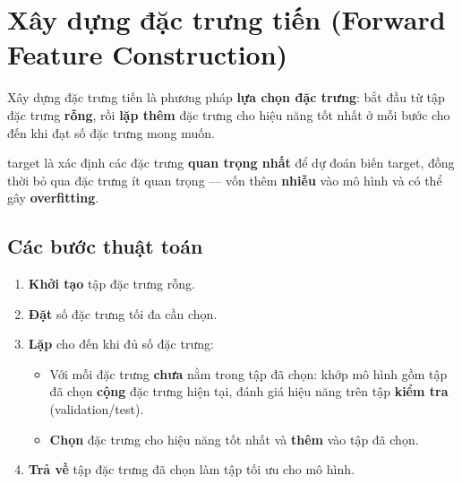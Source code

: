 \section{Xây dựng đặc trưng tiến (Forward Feature Construction)}
\label{sec:forward-feature-construction}

\begin{dinhnghia}[title={Forward Feature Construction}]
Xây dựng đặc trưng tiến là phương pháp \textbf{lựa chọn đặc trưng}: bắt đầu từ tập đặc trưng \textbf{rỗng}, rồi \textbf{lặp thêm} đặc trưng cho hiệu năng tốt nhất ở mỗi bước cho đến khi đạt số đặc trưng mong muốn.
\end{dinhnghia}

\begin{ynghia}[title={target lựa chọn đặc trưng}]
target là xác định các đặc trưng \textbf{quan trọng nhất} để dự đoán biến target, đồng thời bỏ qua đặc trưng ít quan trọng --- vốn thêm \textbf{nhiễu} vào mô hình và có thể gây \textbf{overfitting}.
\end{ynghia}

\subsection{Các bước thuật toán}

\begin{phuongphap}[title={Các bước Forward Feature Construction}]
\begin{enumerate}
  \item \textbf{Khởi tạo} tập đặc trưng rỗng.
  \item \textbf{Đặt} số đặc trưng tối đa cần chọn.
  \item \textbf{Lặp} cho đến khi đủ số đặc trưng:
  \begin{itemize}
    \item Với mỗi đặc trưng \textbf{chưa} nằm trong tập đã chọn: khớp mô hình gồm tập đã chọn \textbf{cộng} đặc trưng hiện tại, đánh giá hiệu năng trên tập \textbf{kiểm tra} (validation/test).
    \item \textbf{Chọn} đặc trưng cho hiệu năng tốt nhất và \textbf{thêm} vào tập đã chọn.
  \end{itemize}
  \item \textbf{Trả về} tập đặc trưng đã chọn làm tập tối ưu cho mô hình.
\end{enumerate}
\end{phuongphap}

